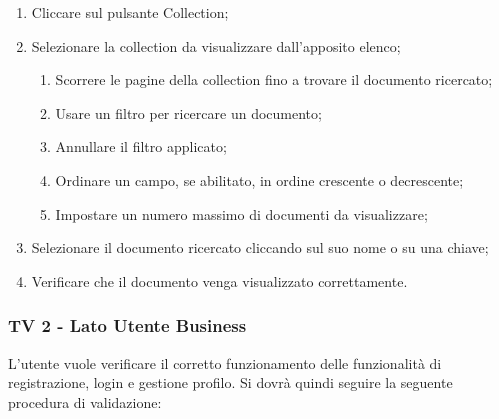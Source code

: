 \begin{enumerate}
\item Cliccare sul pulsante Collection;
\item Selezionare la collection da visualizzare dall'apposito elenco;
\begin{enumerate}
\item Scorrere le pagine della collection fino a trovare il documento ricercato;
\item Usare un filtro per ricercare un documento;
\item Annullare il filtro applicato;
\item Ordinare un campo, se abilitato, in ordine crescente o decrescente;
\item Impostare un numero massimo di documenti da visualizzare;
\end{enumerate}
\item Selezionare il documento ricercato cliccando sul suo nome o su una chiave;
\item Verificare che il documento venga visualizzato correttamente.
\end{enumerate}

\subsubsection{TV 2 - Lato Utente Business}
L’utente vuole verificare il corretto funzionamento delle funzionalità di registrazione, login e gestione profilo.
Si dovrà quindi seguire la seguente procedura di validazione:

